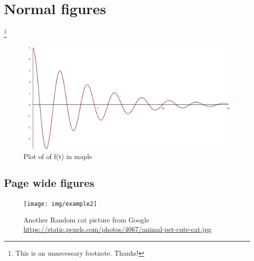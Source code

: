 
\section{Normal figures}
\lipsum[1-2]\footnote{This is an unnecessary footnote. Thanks!}

\begin{figure}[h]
  \centering
  \includegraphics[width=\linewidth]{img/plot}
  \caption{Plot of of f(t) in maple}
  \label{img:function}
\end{figure}

\lipsum[3-4]

\subsection{Page wide figures}
\lipsum[5]

\begin{figure}[ht]
  \centering
  \texttt{[image: img/example2]}
  \caption{Another Random cat picture from Google \protect\url{https://static.pexels.com/photos/4067/animal-pet-cute-cat.jpg}}
  \label{img:cat2}
\end{figure}

